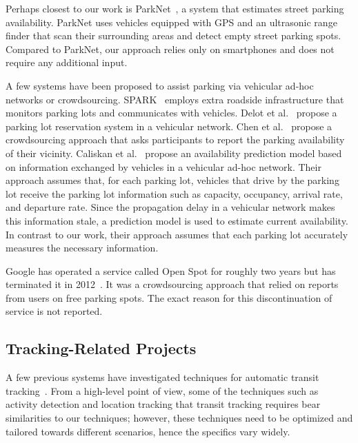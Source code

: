 Perhaps closest to our work is ParkNet~\cite{Mathur:2010:PDS}, a system that
estimates street parking availability. ParkNet uses vehicles equipped with GPS
and an ultrasonic range finder that scan their surrounding areas and detect
empty street parking spots. Compared to ParkNet, our approach relies only on
smartphones and does not require any additional input.

A few systems have been proposed to assist parking via vehicular ad-hoc networks
or crowdsourcing. SPARK~\cite{5062057} employs extra roadside infrastructure
that monitors parking lots and communicates with vehicles. Delot et
al.~\cite{Delot:2009:CRP} propose a parking lot reservation system in a
vehicular network. Chen et al.~\cite{Chen:2012:COS} propose a crowdsourcing
approach that asks participants to report the parking availability of their
vicinity. Caliskan et al.~\cite{4212497} propose an availability
prediction model based on information exchanged by vehicles in a vehicular
ad-hoc network. Their approach assumes that, for each parking lot, vehicles that
drive by the parking lot receive the parking lot information such as capacity,
occupancy, arrival rate, and departure rate. Since the propagation delay in a
vehicular network makes this information stale, a prediction model is used to
estimate current availability. In contrast to our work, their approach assumes
that each parking lot accurately measures the necessary information.

Google has operated a service called Open Spot for roughly two years but has
terminated it in 2012~\cite{open-spot}. It was a crowdsourcing approach that
relied on reports from users on free parking spots. The exact reason for this
discontinuation of service is not reported.

\subsection{Tracking-Related Projects}

A few previous systems have investigated techniques for automatic transit
tracking~\cite{Biagioni:2011:EAT, Thiagarajan:2010:CTT, Zhou:2012:LWP}. From a
high-level point of view, some of the techniques such as activity detection and
location tracking that transit tracking requires bear similarities to
our techniques; however, these techniques need to be optimized and tailored
towards different scenarios, hence the specifics vary widely.

